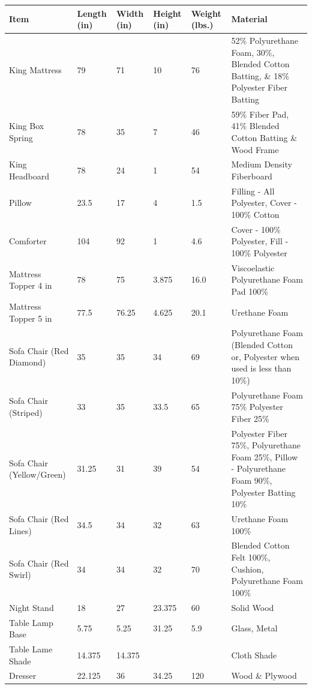 \documentclass[12pt,oneside]{book}
\begin{document}
\begin{table}[H]
\centering
\begin{tabular}{|L{0.23\textwidth}|C{0.08\textwidth}|C{0.08\textwidth}|C{0.08\textwidth}|C{0.08\textwidth}|L{0.37\textwidth}|}
\hline
Item 						&Length (in) 	&Width (in) 	&Height (in) 	&Weight (lbs.) 	&Material \\ \hline \hline
King Mattress 				&79 			&71 			&10 			&76 			&52\% Polyurethane Foam, 30\%, Blended Cotton Batting, \& 18\% Polyester Fiber Batting \\ \hline
King Box Spring 			&78 			&35 			&7 				&46 			&59\% Fiber Pad, 41\% Blended Cotton Batting \& Wood Frame \\ \hline
King Headboard 				&78 			&24 			&1 				&54 			&Medium Density Fiberboard \\ \hline
Pillow 						&23.5 			&17 			&4 				&1.5 			&Filling - All Polyester, Cover - 100\% Cotton \\ \hline
Comforter 					&104 			&92 			&1 				&4.6 			&Cover - 100\% Polyester, Fill - 100\% Polyester \\ \hline
Mattress Topper 4 in 		&78 			&75 			&3.875 			&16.0  			&Viscoelastic Polyurethane Foam Pad 100\% \\ \hline
Mattress Topper 5 in 		&77.5 			&76.25 			&4.625 			&20.1  			&Urethane Foam \\ \hline
Sofa Chair (Red Diamond) 	&35 			&35 			&34 			&69 			&Polyurethane Foam (Blended Cotton or, Polyester when used is less than 10\%) \\ \hline
Sofa Chair (Striped) 		&33 			&35 			&33.5 			&65 			&Polyurethane Foam 75\% Polyester Fiber 25\% \\ \hline
Sofa Chair (Yellow/Green) 	&31.25 			&31 			&39 			&54 			&Polyester Fiber 75\%, Polyurethane Foam 25\%, Pillow - Polyurethane Foam 90\%, Polyester Batting 10\% \\ \hline
Sofa Chair (Red Lines) 		&34.5 			&34 			&32 			&63 			&Urethane Foam 100\% \\ \hline
Sofa Chair (Red Swirl) 		&34 			&34 			&32 			&70 			&Blended Cotton Felt 100\%, Cushion, Polyurethane Foam 100\% \\ \hline
Night Stand 				&18 			&27 			&23.375 		&60 			&Solid Wood \\ \hline
Table Lamp Base 			&5.75 			&5.25 			&31.25 			&5.9 			&Glass, Metal  \\ \hline
Table Lame Shade 			&14.375 		&14.375 		&  				&  				&Cloth Shade \\ \hline 
Dresser 					&22.125 		&36 			&34.25 			&120 			&Wood \& Plywood \\ \hline

\end{tabular}
\end{table}
\end{document}
